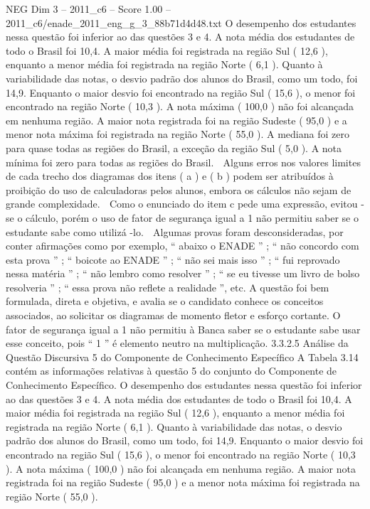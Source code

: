 \begin{textsample}{NEG Dim 3 – 2011\_c6 – Score 1.00 – 2011\_c6/enade\_2011\_eng\_g\_3\_88b71d4d48.txt}
O desempenho dos estudantes nessa questão foi inferior ao das questões 3 e 4.
A nota média dos estudantes de todo o Brasil foi 10,4.
A maior média foi registrada na região Sul ( 12,6 ), enquanto a menor média foi registrada na região Norte ( 6,1 ).
Quanto à variabilidade das notas, o desvio padrão dos alunos do Brasil, como um todo, foi 14,9.
Enquanto o maior desvio foi encontrado na região Sul ( 15,6 ), o menor foi encontrado na região Norte ( 10,3 ).
A nota máxima ( 100,0 ) não foi alcançada em nenhuma região.
A maior nota registrada foi na região Sudeste ( 95,0 ) e a menor nota máxima foi registrada na região Norte ( 55,0 ).
A mediana foi zero para quase todas as regiões do Brasil, a exceção da região Sul ( 5,0 ).
A nota mínima foi zero para todas as regiões do Brasil.  Alguns erros nos valores limites de cada trecho dos diagramas dos itens ( a ) e ( b ) podem ser atribuídos à proibição do uso de calculadoras pelos alunos, embora os cálculos não sejam de grande complexidade.  Como o enunciado do item c pede uma expressão, evitou -se o cálculo, porém o uso de fator de segurança igual a 1 não permitiu saber se o estudante sabe como utilizá -lo.  Algumas provas foram desconsideradas, por conter afirmações como por exemplo, “ abaixo o ENADE ” ; “ não concordo com esta prova ” ; “ boicote ao ENADE ” ; “ não sei mais isso ” ; “ fui reprovado nessa matéria ” ; “ não lembro como resolver ” ; “ se eu tivesse um livro de bolso resolveria ” ; “ essa prova não reflete a realidade ”, etc.
A questão foi bem formulada, direta e objetiva, e avalia se o candidato conhece os conceitos associados, ao solicitar os diagramas de momento fletor e esforço cortante.
O fator de segurança igual a 1 não permitiu à Banca saber se o estudante sabe usar esse conceito, pois “ 1 ” é elemento neutro na multiplicação. 3.3.2.5 Análise da Questão Discursiva 5 do Componente de Conhecimento Específico A Tabela 3.14 contém as informações relativas à questão 5 do conjunto do Componente de Conhecimento Específico.
O desempenho dos estudantes nessa questão foi inferior ao das questões 3 e 4.
A nota média dos estudantes de todo o Brasil foi 10,4.
A maior média foi registrada na região Sul ( 12,6 ), enquanto a menor média foi registrada na região Norte ( 6,1 ).
Quanto à variabilidade das notas, o desvio padrão dos alunos do Brasil, como um todo, foi 14,9.
Enquanto o maior desvio foi encontrado na região Sul ( 15,6 ), o menor foi encontrado na região Norte ( 10,3 ).
A nota máxima ( 100,0 ) não foi alcançada em nenhuma região.
A maior nota registrada foi na região Sudeste ( 95,0 ) e a menor nota máxima foi registrada na região Norte ( 55,0 ).

\end{textsample}
